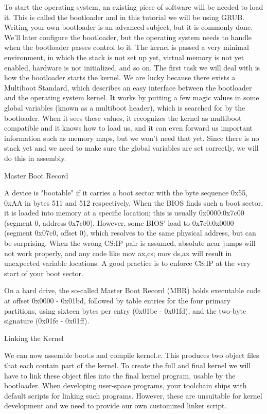 \documentclass[11pt]{article}
\begin{document}
To start the operating system, an existing piece of software will be needed to load it. This is called the bootloader and in this tutorial we will be using GRUB. Writing your own bootloader is an advanced subject, but it is commonly done. We'll later configure the bootloader, but the operating system needs to handle when the bootloader passes control to it. The kernel is passed a very minimal environment, in which the stack is not set up yet, virtual memory is not yet enabled, hardware is not initialized, and so on.
The first task we will deal with is how the bootloader starts the kernel. We are lucky because there exists a Multiboot Standard, which describes an easy interface between the bootloader and the operating system kernel. It works by putting a few magic values in some global variables (known as a multiboot header), which is searched for by the bootloader. When it sees these values, it recognizes the kernel as multiboot compatible and it knows how to load us, and it can even forward us important information such as memory maps, but we won't need that yet.
Since there is no stack yet and we need to make sure the global variables are set correctly, we will do this in assembly.

Master Boot Record

A device is "bootable" if it carries a boot sector with the byte sequence 0x55, 0xAA in bytes 511 and 512 respectively. When the BIOS finds such a boot sector, it is loaded into memory at a specific location; this is usually 0x0000:0x7c00 (segment 0, address 0x7c00). However, some BIOS' load to 0x7c0:0x0000 (segment 0x07c0, offset 0), which resolves to the same physical address, but can be surprising.
When the wrong CS:IP pair is assumed, absolute near jumps will not work properly, and any code like mov ax,cs; mov ds,ax will result in unexpected variable locations. A good practice is to enforce CS:IP at the very start of your boot sector.

On a hard drive, the so-called Master Boot Record (MBR) holds executable code at offset 0x0000 - 0x01bd, followed by table entries for the four primary partitions, using sixteen bytes per entry (0x01be - 0x01fd), and the two-byte signature (0x01fe - 0x01ff).

Linking the Kernel

We can now assemble boot.s and compile kernel.c. This produces two object files that each contain part of the kernel. To create the full and final kernel we will have to link these object files into the final kernel program, usable by the bootloader. When developing user-space programs, your toolchain ships with default scripts for linking such programs. However, these are unsuitable for kernel development and we need to provide our own customized linker script.
\end{document}

